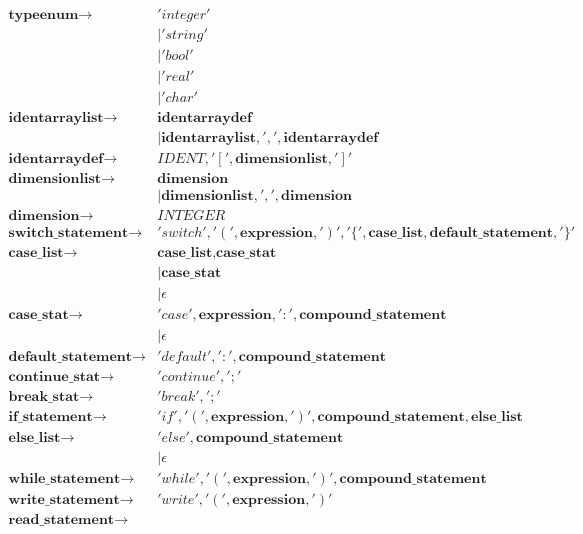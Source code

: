 \documentclass{article}
\begin{document}
	  \begin{align}
	  \textbf{typeenum} \rightarrow &
	  'integer' \\
	  &|'string' \\
	  &|'bool'	\\
	  &|'real'\\
	  &|'char'\\
	  \textbf{identarraylist} \rightarrow &
	  \textbf{identarraydef} \\
	  &|\textbf{identarraylist},',',\textbf{identarraydef}\\
	  \textbf{identarraydef} \rightarrow &
	  IDENT, '[', \textbf{dimensionlist}, ']'\\
	  \textbf{dimensionlist} \rightarrow &
	  \textbf{dimension} \\
	  &|\textbf{dimensionlist},',',\textbf{dimension}\\
	  \textbf{dimension} \rightarrow &
	  INTEGER \\
	  \textbf{switch\_statement} \rightarrow &
	  'switch','(',\textbf{expression},')', '\lbrace', \textbf{case\_list},\textbf{default\_statement}, '\rbrace' \\
	  \textbf{case\_list} \rightarrow &
	  \textbf{case\_list},\textbf{case\_stat} \\
	  &|\textbf{case\_stat} \\
	  &|\epsilon\\
	  \textbf{case\_stat} \rightarrow &
	  'case',\textbf{expression},':',\textbf{compound\_statement}\\
	  &|\epsilon\\
	  \textbf{default\_statement} \rightarrow &
	  'default',':',\textbf{compound\_statement}\\
	  \textbf{continue\_stat} \rightarrow & 
	  'continue',';'\\
	  \textbf{break\_stat} \rightarrow & 
	  'break',';'\\
	  \textbf{if\_statement} \rightarrow &
	  'if','(',\textbf{expression},')',\textbf{compound\_statement},\textbf{else\_list}\\
	  \textbf{else\_list} \rightarrow &
	  'else',\textbf{compound\_statement}\\
	  &|\epsilon\\
	  \textbf{while\_statement} \rightarrow &
	  'while','(',\textbf{expression},')',\textbf{compound\_statement}\\
	  \textbf{write\_statement} \rightarrow &
	  'write','(',\textbf{expression},')'\\
	  \textbf{read\_statement} \rightarrow &

\end{align}
\end{document}
